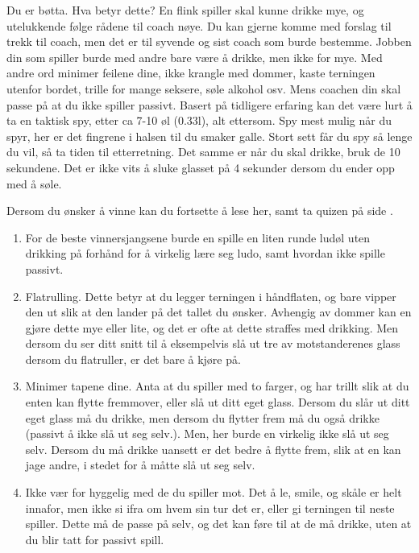 \documentclass[10pt,a4paper,norsk,openany]{book}
\begin{document}
Du er bøtta. Hva betyr dette? En flink spiller skal kunne drikke mye, og
utelukkende følge rådene til coach nøye. Du kan gjerne komme med forslag til
trekk til coach, men det er til syvende og sist coach som burde bestemme. Jobben
din som spiller burde med andre bare være å drikke, men ikke for mye. Med andre
ord minimer feilene dine, ikke krangle med dommer, kaste terningen utenfor
bordet, trille for mange seksere, søle alkohol osv. Mens coachen din skal passe
på at du ikke spiller passivt. Basert på tidligere erfaring kan det være lurt å
ta en taktisk spy, etter ca 7-10 øl (0.33l), alt ettersom. Spy mest mulig når du
spyr, her er det fingrene i halsen til du smaker galle. Stort sett får du spy så
lenge du vil, så ta tiden til etterretning. Det samme er når du skal drikke,
bruk de 10 sekundene. Det er ikke vits å sluke glasset på 4 sekunder dersom du
ender opp med å søle. \medskip

\noindent
Dersom du ønsker å vinne kan du fortsette å lese her, samt ta quizen på side
\pageref{chap:quiz}.
\begin{enumerate}
    
  \item For de beste
vinnersjangsene burde en spille en liten runde ludøl uten drikking på
    forhånd for å virkelig lære seg ludo, samt hvordan ikke spille passivt.
    
  \item Flatrulling. Dette betyr at du legger terningen i håndflaten, og bare
    vipper den ut slik at den lander på det tallet du ønsker. Avhengig av dommer
    kan en gjøre dette mye eller lite, og det er ofte at dette straffes med
    drikking. Men dersom du ser ditt snitt til å eksempelvis slå ut tre av
    motstanderenes glass dersom du flatruller, er det bare å kjøre på.
    
  \item Minimer tapene dine. Anta at du spiller med to farger, og har trillt
    slik at du enten kan flytte fremmover, eller slå ut ditt eget glass. Dersom
    du slår ut ditt eget glass må du drikke, men dersom du flytter frem må du også
    drikke (passivt å ikke slå ut seg selv.). Men, her burde en virkelig ikke slå
    ut seg selv. Dersom du må drikke uansett er det bedre å flytte frem, slik
    at en kan jage andre, i stedet for å måtte slå ut seg selv.
    
  \item Ikke vær for hyggelig med de du spiller mot. Det å le, smile, og skåle
    er helt innafor, men ikke si ifra om hvem sin tur det er, eller gi terningen
    til neste spiller. Dette må de passe på selv, og det kan føre til at de må
    drikke, uten at du blir tatt for passivt spill. 
\end{enumerate}
\end{document}

